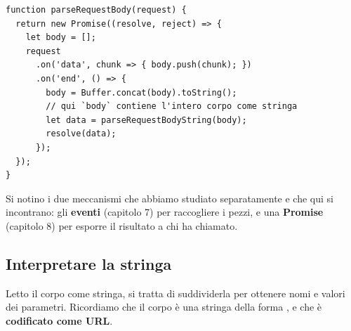 \begin{affianco}[0.55][c]
\begin{lstlisting}[style=js, name=body-parser.js]
function parseRequestBody(request) {
  return new Promise((resolve, reject) => {
    let body = [];
    request
      .on('data', chunk => { body.push(chunk); })
      .on('end', () => {
        body = Buffer.concat(body).toString();
        // qui `body` contiene l'intero corpo come stringa
        let data = parseRequestBodyString(body);
        resolve(data);
      });
  });
}
\end{lstlisting}
\risultato
\begin{immagine}
\end{immagine}
\end{affianco}

Si notino i due meccanismi che abbiamo studiato separatamente e che qui si
incontrano: gli \textbf{eventi} (capitolo 7) per raccogliere i pezzi, e una
\textbf{Promise} (capitolo 8) per esporre il risultato a chi ha chiamato.

\subsection{Interpretare la stringa}

Letto il corpo come stringa, si tratta di suddividerla per ottenere nomi e
valori dei parametri. Ricordiamo che il corpo è una stringa della forma
, e che è \textbf{codificato come URL}.

